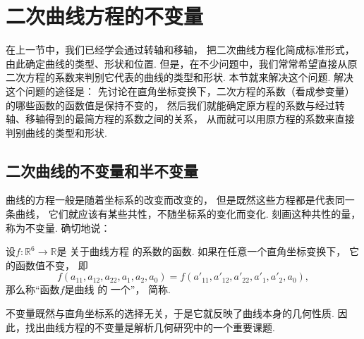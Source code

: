 \section{二次曲线方程的不变量}
在上一节中，我们已经学会通过转轴和移轴，
把二次曲线方程化简成标准形式，由此确定曲线的类型、形状和位置.
但是，在不少问题中，我们常常希望直接从原二次方程的系数来判别它代表的曲线的类型和形状.
本节就来解决这个问题.
解决这个问题的途径是：
先讨论在直角坐标变换下，二次方程的系数（看成参变量）的哪些函数的函数值是保持不变的，
然后我们就能确定原方程的系数与经过转轴、移轴得到的最简方程的系数之间的关系，
从而就可以用原方程的系数来直接判别曲线的类型和形状.

\subsection{二次曲线的不变量和半不变量}
曲线的方程一般是随着坐标系的改变而改变的，
但是既然这些方程都是代表同一条曲线，
它们就应该有某些共性，不随坐标系的变化而变化.
刻画这种共性的量，称为不变量.
确切地说：
\begin{definition}
设\(f\colon \mathbb{R}^6 \to \mathbb{R}\)是
关于曲线方程  的系数的函数.
如果在任意一个直角坐标变换下，
它的函数值不变，
即\begin{equation*}
	f(a_{11},a_{12},a_{22},a_1,a_2,a_0)
	= f(a'_{11},a'_{12},a'_{22},a'_1,a'_2,a_0),
\end{equation*}
那么称“函数\(f\)是曲线  的
一个”，
简称.
\end{definition}

不变量既然与直角坐标系的选择无关，于是它就反映了曲线本身的几何性质.
因此，找出曲线方程的不变量是解析几何研究中的一个重要课题.

